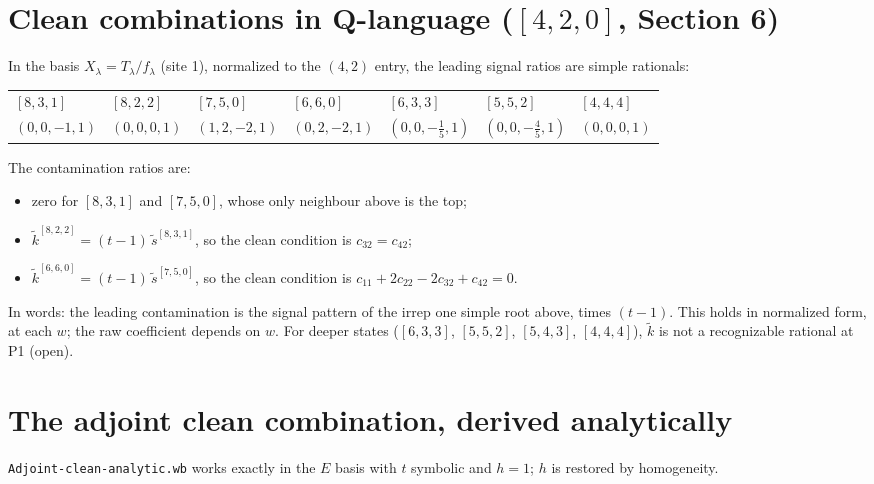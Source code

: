\documentclass[11pt]{article}
\begin{document}
\section{Clean combinations in Q-language ($[4,2,0]$, Section 6)}
In the basis $X_\lambda=T_\lambda/f_\lambda$ (site 1), normalized to the $(4,2)$ entry, the leading signal ratios are simple rationals:
\begin{center}
\begin{tabular}{lllllll}
\toprule
$[8,3,1]$ & $[8,2,2]$ & $[7,5,0]$ & $[6,6,0]$ & $[6,3,3]$ & $[5,5,2]$ & $[4,4,4]$\\
$(0,0,-1,1)$ & $(0,0,0,1)$ & $(1,2,-2,1)$ & $(0,2,-2,1)$ & $(0,0,-\tfrac15,1)$ & $(0,0,-\tfrac45,1)$ & $(0,0,0,1)$\\
\bottomrule
\end{tabular}
\end{center}
The contamination ratios are:
\begin{itemize}
\item zero for $[8,3,1]$ and $[7,5,0]$, whose only neighbour above is the top;
\item $\tilde k^{[8,2,2]}=(t-1)\,\tilde s^{[8,3,1]}$, so the clean condition is $c_{32}=c_{42}$;
\item $\tilde k^{[6,6,0]}=(t-1)\,\tilde s^{[7,5,0]}$, so the clean condition is $c_{11}+2c_{22}-2c_{32}+c_{42}=0$.
\end{itemize}
In words: the leading contamination is the signal pattern of the irrep one simple root above, times $(t-1)$. This holds in normalized form, at each $w$; the raw coefficient depends on $w$. For deeper states ($[6,3,3]$, $[5,5,2]$, $[5,4,3]$, $[4,4,4]$), $\tilde k$ is not a recognizable rational at P1 (open).

\section{The adjoint clean combination, derived analytically}\label{sec:adjoint}
\texttt{Adjoint-clean-analytic.wb} works exactly in the $E$ basis with $t$ symbolic and $h=1$; $h$ is restored by homogeneity.
\end{document}
